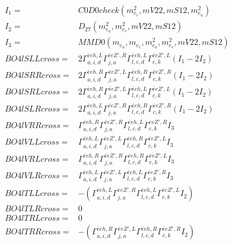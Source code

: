 \documentclass[A4,landscape]{article}
\begin{document}
\begin{align} 
I_1 = & C0D0check(m^2_{e_{{c}}}, mV22, mS12, m^2_{e_{{a}}}) \\ 
I_2 = & D_{27}(m^2_{e_{{a}}}, m^2_{e_{{c}}}, mV22, mS12) \\ 
I_3 = & MMD0(m_{e_{{a}}}, m_{e_{{c}}}, m^2_{e_{{a}}}, m^2_{e_{{c}}}, mV22, mS12) \\ 
  BO4lSLLcross= & 2  \Gamma^{\bar{e}e h ,L}_{a, i, d} \Gamma^{\bar{e}e {Z'} ,R}_{j, a} \Gamma^{\bar{e}e h ,L}_{l, c, d} \Gamma^{\bar{e}e {Z'} ,L}_{c, k} (I_1 - 2 I_2) \\ 
  BO4lSRRcross= & 2  \Gamma^{\bar{e}e h ,R}_{a, i, d} \Gamma^{\bar{e}e {Z'} ,L}_{j, a} \Gamma^{\bar{e}e h ,R}_{l, c, d} \Gamma^{\bar{e}e {Z'} ,R}_{c, k} (I_1 - 2 I_2) \\ 
  BO4lSRLcross= & 2  \Gamma^{\bar{e}e h ,R}_{a, i, d} \Gamma^{\bar{e}e {Z'} ,L}_{j, a} \Gamma^{\bar{e}e h ,L}_{l, c, d} \Gamma^{\bar{e}e {Z'} ,L}_{c, k} (I_1 - 2 I_2) \\ 
  BO4lSLRcross= & 2  \Gamma^{\bar{e}e h ,L}_{a, i, d} \Gamma^{\bar{e}e {Z'} ,R}_{j, a} \Gamma^{\bar{e}e h ,R}_{l, c, d} \Gamma^{\bar{e}e {Z'} ,R}_{c, k} (I_1 - 2 I_2) \\ 
  BO4lVRRcross= &  \Gamma^{\bar{e}e h ,R}_{a, i, d} \Gamma^{\bar{e}e {Z'} ,R}_{j, a} \Gamma^{\bar{e}e h ,L}_{l, c, d} \Gamma^{\bar{e}e {Z'} ,R}_{c, k} I_3 \\ 
  BO4lVLLcross= &  \Gamma^{\bar{e}e h ,L}_{a, i, d} \Gamma^{\bar{e}e {Z'} ,L}_{j, a} \Gamma^{\bar{e}e h ,R}_{l, c, d} \Gamma^{\bar{e}e {Z'} ,L}_{c, k} I_3 \\ 
  BO4lVRLcross= &  \Gamma^{\bar{e}e h ,R}_{a, i, d} \Gamma^{\bar{e}e {Z'} ,R}_{j, a} \Gamma^{\bar{e}e h ,R}_{l, c, d} \Gamma^{\bar{e}e {Z'} ,L}_{c, k} I_3 \\ 
  BO4lVLRcross= &  \Gamma^{\bar{e}e h ,L}_{a, i, d} \Gamma^{\bar{e}e {Z'} ,L}_{j, a} \Gamma^{\bar{e}e h ,L}_{l, c, d} \Gamma^{\bar{e}e {Z'} ,R}_{c, k} I_3 \\ 
  BO4lTLLcross= & -( \Gamma^{\bar{e}e h ,L}_{a, i, d} \Gamma^{\bar{e}e {Z'} ,R}_{j, a} \Gamma^{\bar{e}e h ,L}_{l, c, d} \Gamma^{\bar{e}e {Z'} ,L}_{c, k} I_2) \\ 
  BO4lTLRcross= & 0 \\ 
  BO4lTRLcross= & 0 \\ 
  BO4lTRRcross= & -( \Gamma^{\bar{e}e h ,R}_{a, i, d} \Gamma^{\bar{e}e {Z'} ,L}_{j, a} \Gamma^{\bar{e}e h ,R}_{l, c, d} \Gamma^{\bar{e}e {Z'} ,R}_{c, k} I_2) \\ 
\end{align} 
\end{document}
